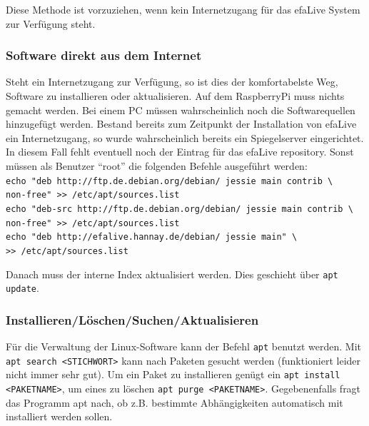 \documentclass[a4paper,12pt,twoside]{article}
\begin{document}
Diese Methode ist vorzuziehen, wenn kein Internetzugang für das efaLive
System zur Verfügung steht.


\subsubsection{Software direkt aus dem Internet}
\label{sct:software_internet}
Steht ein Internetzugang zur Verfügung, so ist dies der komfortabelste
Weg, Software zu installieren oder aktualisieren. Auf dem RaspberryPi 
muss nichts gemacht werden. Bei einem PC müssen wahrscheinlich noch die
Softwarequellen hinzugefügt werden. Bestand bereits zum
Zeitpunkt der Installation von efaLive ein Internetzugang, so wurde
wahrscheinlich bereits ein Spiegelserver eingerichtet. In diesem Fall fehlt
eventuell noch der Eintrag für das efaLive repository. Sonst müssen als
Benutzer "`root"' die folgenden Befehle ausgeführt werden:
\bigskip
\\
\texttt{echo "deb http://ftp.de.debian.org/debian/ jessie main contrib \textbackslash\\
    non-free"\ {\textgreater}{\textgreater} /etc/apt/sources.list}
\\
\texttt{echo "deb-src http://ftp.de.debian.org/debian/ jessie main contrib \textbackslash\\
    non-free"\ {\textgreater}{\textgreater} /etc/apt/sources.list}
\\
\texttt{echo "deb http://efalive.hannay.de/debian/ jessie main" \textbackslash\\
    {\textgreater}{\textgreater} /etc/apt/sources.list}

\bigskip
Danach muss der interne Index aktualisiert werden. Dies geschieht über
\texttt{apt update}.


\subsubsection{Installieren/Löschen/Suchen/Aktualisieren}
\label{sct:software_install}
Für die Verwaltung der
Linux-Software kann der Befehl \texttt{apt}
benutzt werden. Mit \texttt{apt search
{\textless}STICHWORT{\textgreater}} kann nach Paketen
gesucht werden (funktioniert leider nicht immer sehr gut). Um ein Paket
zu installieren genügt ein \texttt{apt install
{\textless}PAKETNAME{\textgreater}}, um eines zu löschen
\texttt{apt purge
{\textless}PAKETNAME{\textgreater}}. Gegebenenfalls fragt
das Programm apt nach, ob z.B. bestimmte Abhängigkeiten
automatisch mit installiert werden sollen.
\end{document}
